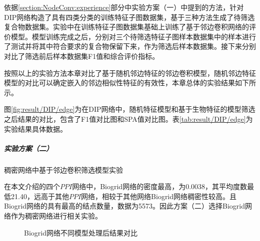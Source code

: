依据\ref{section:NodeConv:experience}部分中实验方案（一）中提到的方法，针对DIP网络构造了具有四类分类的训练特征子图数据集，基于三种方法生成了待筛选复合物数据集。实验中在训练特征子图数据集基础上训练了基于邻边卷积网络的评价模型。模型训练完成之后，分别对三个待筛选特征子图样本数据集中的样本进行了测试并将其中符合要求的复合物保留下来，作为筛选后样本数据集。接下来分别对比了筛选前后样本数据集F1值和综合评价指标。

按照以上的实验方法本章对比了基于随机邻边特征的邻边卷积模型，随机邻边特征模型的对比可以确定嵌入的邻边相似性特征的有效性，本章总体的实验结果如下所示。

图\ref{fig:result/DIP/edge}为在DIP网络中，随机特征模型和基于生物特征的模型筛选之后结果的对比，包含了F1值对比图和SPA值对比图。表\ref{tab:result/DIP/edge}为实验结果具体数据。


\subparagraph*{实验方案（二）} 稠密网络中基于邻边卷积筛选模型实验

在本文介绍的四个$PPI$网络中，Biogrid网络的密度最高，为0.0038，其平均度数最低21.40，远高于其他$PPI$网络，相较于其他网络Biogrid网络稠密性较高。且Biogrid网络的具有最高的结点数量，数据为5573。因此方案（二）选择Biogrid网络作为稠密网络进行相关实验。


\begin{figure}[htbp]
    \centering
    \vskip0.2cm
    \caption{Biogrid网络不同模型处理后结果对比}
    \label{fig:result/Biogrid/edge}
\end{figure}

